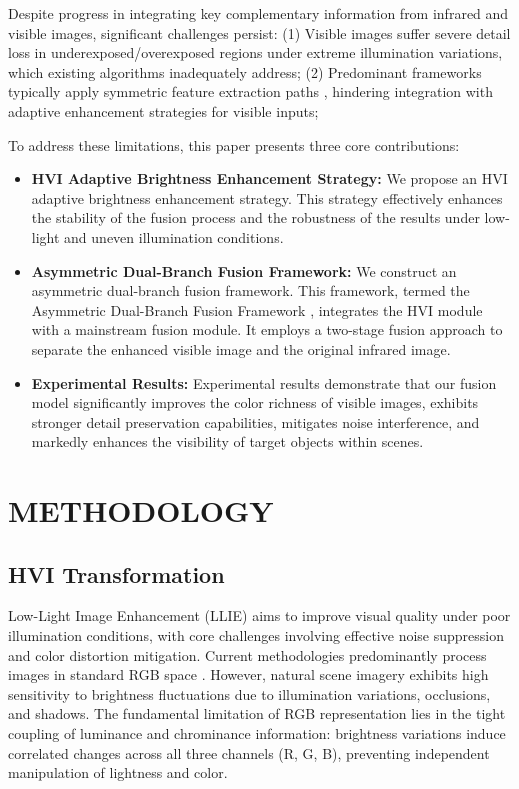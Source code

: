 \documentclass[journal]{IEEEtran}
\begin{document}
Despite progress in integrating key complementary information from infrared and visible images, significant challenges persist: (1) Visible images suffer severe detail loss in underexposed/overexposed regions under extreme illumination variations, which existing algorithms inadequately address; (2) Predominant frameworks typically apply symmetric feature extraction paths \cite{lin2022review}, hindering integration with adaptive enhancement strategies for visible inputs;

To address these limitations, this paper presents three core contributions: 
\begin{itemize}
    \item \textbf{HVI Adaptive Brightness Enhancement Strategy:} We propose an HVI adaptive brightness enhancement strategy. This strategy effectively enhances the stability of the fusion process and the robustness of the results under low-light and uneven illumination conditions.
    \item \textbf{Asymmetric Dual-Branch Fusion Framework:} We construct an asymmetric dual-branch fusion framework. This framework, termed the Asymmetric Dual-Branch Fusion Framework , integrates the HVI module with a mainstream fusion module. It employs a two-stage fusion approach to separate the enhanced visible image and the original infrared image.
    \item \textbf{Experimental Results:} Experimental results demonstrate that our fusion model significantly improves the color richness of visible images, exhibits stronger detail preservation capabilities, mitigates noise interference, and markedly enhances the visibility of target objects within scenes.
\end{itemize}


\section{METHODOLOGY}
\label{sec:method}
\subsection{HVI Transformation}
\label{ssec:hvi}
Low-Light Image Enhancement (LLIE) aims to improve visual quality under poor illumination conditions, with core challenges involving effective noise suppression and color distortion mitigation. Current methodologies predominantly process images in standard RGB space \cite{yan2025hvi}. However, natural scene imagery exhibits high sensitivity to brightness fluctuations due to illumination variations, occlusions, and shadows. The fundamental limitation of RGB representation lies in the tight coupling of luminance and chrominance information: brightness variations induce correlated changes across all three channels (R, G, B), preventing independent manipulation of lightness and color.
\end{document}
